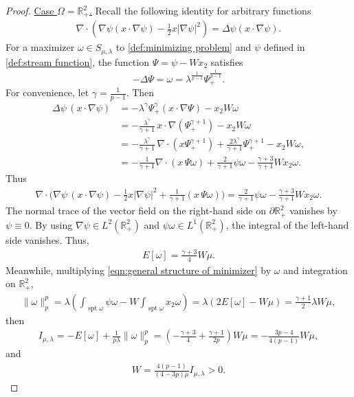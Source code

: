 \documentclass[11pt,letterpaper]{amsart}
\theoremstyle{definition}
\theoremstyle{remark}
\newcommand{\R}{\mathbb{R}}
\newcommand{\p}{\partial}
\newcommand{\spt}{\operatorname{spt}}
\numberwithin{equation}{section}
\begin{document}
\begin{proof}
    \underline{Case $\Omega=\R^2_+$.} Recall the following identity for arbitrary functions
    \begin{align*}
        \nabla \cdot \left( \nabla\psi(x\cdot\nabla\psi) - \frac{1}{2}x\left|\nabla\psi\right|^2\right)=\Delta\psi(x\cdot\nabla\psi).
    \end{align*}
    For a maximizer $\omega\in S_{\mu,\lambda}$ to \eqref{def:minimizing problem} and $\psi$ defined in \eqref{def:stream function}, the function $\Psi=\psi-Wx_2$ satisfies 
    $$-\Delta \Psi = \omega=\lambda^{\frac{1}{p-1}}\Psi_+^{\frac{1}{p-1}}.$$
    For convenience, let $\gamma=\frac{1}{p-1}$. Then
    \begin{align*}
        \Delta\psi\,(x\cdot\nabla\psi) &= -\lambda^{\gamma} \Psi_+^{\gamma} (x\cdot\nabla\Psi) - x_2 W \omega \\
        &= -\frac{\lambda^\gamma}{\gamma+1}\, x\cdot \nabla (\Psi_+^{\gamma+1}) - x_2 W \omega \\
        &= -\frac{\lambda^\gamma}{\gamma+1}\,\nabla\cdot(x \Psi_+^{\gamma+1}) + \frac{2\lambda^\gamma}{\gamma+1} \Psi_+^{\gamma+1} - x_2 W \omega,\\
        &= -\frac{1}{\gamma+1} \nabla\cdot (x\,\Psi\omega) + \frac{2}{\gamma+1}\psi\omega - \frac{\gamma+3}{\gamma+1} W x_2\omega.
    \end{align*}
    Thus
    \begin{align*}
        \nabla \cdot \Big( \nabla\psi\,(x\cdot\nabla\psi) - \frac12 x |\nabla\psi|^2 + \frac{1}{\gamma+1} (x\,\Psi\omega) \Big) = \frac{2}{\gamma+1}\psi\omega - \frac{\gamma+3}{\gamma+1} W x_2\omega.
    \end{align*}
    The normal trace of the vector field on the right-hand side on $\p \R^2_+$ vanishes by $\psi\equiv 0 $. By using $\nabla\psi\in L^2(\R^2_+)$ and $\psi\omega\in L^1(\R^2_+)$, the integral of the left-hand side vanishes. Thus,
    \begin{align*}
        E[\omega]=\frac{\gamma+3}{4}W\mu.
    \end{align*}
    Meanwhile, multiplying \eqref{eqn:general structure of minimizer} by $\omega$ and integration on $\R^2_+$,
    \begin{align*}
        \|\omega\|_p^p=\lambda\left( \int_{\spt\omega}\psi\omega-W \int_{\spt\omega}x_2\omega \right)=\lambda\left( 2 E[\omega]-W\mu \right)=\frac{\gamma+1}{2}\lambda W\mu,
    \end{align*}
    then
    \begin{align*}
        I_{\mu,\lambda}=-E[\omega]+\frac{1}{p\lambda}\|\omega\|_p^p=\left(-\frac{\gamma+3}{4}+\frac{\gamma+1}{2p}\right)W\mu = - \frac{3p-4}{4(p-1)}W\mu,
    \end{align*}
    and
    \begin{align*}
        W=\frac{4(p-1)}{(4-3p)\mu} I_{\mu,\lambda} >0.
    \end{align*}


\end{proof}
\end{document}

